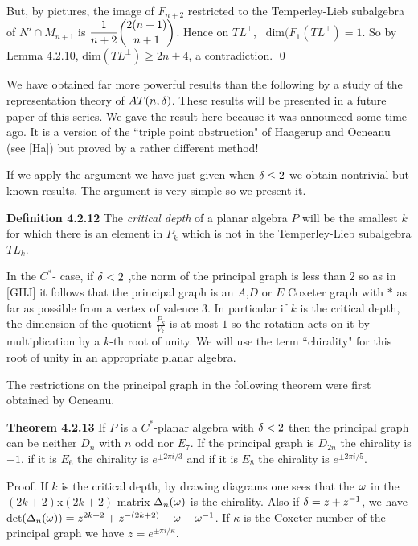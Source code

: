 But, by pictures, the image of $F_{n+2}$ restricted to the
Temperley-Lieb subalgebra of  $N'\cap M_{n+1}$ is
$\displaystyle{\frac{1}{n+2}{2(n+1)\choose n+1}}$.
Hence on $TL^{\perp}$, \
dim$(F_1(TL^{\perp})=1$. So by Lemma 4.2.10,
dim$(TL^{\perp})\geq 2n+4$, a contradiction. \qed




We have obtained far more powerful results than the following by a
study of the representation theory of $AT(n,\delta)$. These results
will be presented in a future paper of this series. We gave the
result here because it was announced some time ago. It is a version
of the ``triple point obstruction" of Haagerup and Ocneanu (see
[Ha]) but proved by a rather different method!

If we apply the argument we have just given when $\delta \leq 2$
we obtain nontrivial but known results. The argument is very
simple so we present it.

{\bf Definition 4.2.12} The {\it critical depth} of a planar 
algebra $P$ will be the smallest $k$ for which there is an element
in $P_k$ which is not in the Temperley-Lieb subalgebra $TL_k$.

In the $C^*$- case, if $\delta < 2$ ,the norm of the principal graph is less than $2$ so
as in [GHJ] it follows that the principal graph is an $A$,$D$ or
$E$ Coxeter graph with $*$ as far as possible from a vertex of 
valence $3$. In particular if $k$ is the critical depth, the 
dimension of the quotient $\frac {P_k}{V_k}$ is at most $1$ so the
rotation acts on it by multiplication by a $k$-th root of unity.
We will use the term ``chirality" for this root of unity in an
appropriate planar algebra.

The restrictions on the principal graph in the following theorem were first obtained by
Ocneanu.

{\bf Theorem 4.2.13} If $P$ is a $C^*$-planar algebra with $\delta < 2$
then the principal graph can be neither $D_n$ with $n$ odd nor $E_7$.
If the principal graph is $D_{2n}$ the chirality is $-1$, if it
is $E_6$ the chirality is $e^{\pm 2\pi i/3}$ and if it is $E_8$ the 
chirality is $e^{\pm 2\pi i/5}$.


\bs
{\sc Proof.} If $k$ is the critical depth, by drawing diagrams one 
sees that the $\omega$ in the $(2k+2)$x$(2k+2)$ matrix $\Delta_n(\omega)$ is the chirality. Also if
$\delta = z + z^{-1}$, we have  det$(\Delta_n(\omega))= z^{2k+2} + z^{-(2k+2)} - \omega - \omega ^{-1}$.
If $\kappa$ is the Coxeter number of the principal graph we have 
$z = e^{\pm \pi i/{\kappa}}$. 
 
